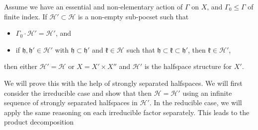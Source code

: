 \begin{prop}
  \label{prop:f-3.32}
  Assume we have an essential and non-elementary action of \(\Gamma\) on \(X\), and \(\Gamma_0 \leq \Gamma\) of finite index. If \(\mathcal{H}' \subset \mathcal{H}\) is a non-empty sub-pocset such that
  \begin{itemize}
  \item \(\Gamma_0 \cdot \mathcal{H}' = \mathcal{H}'\), and
  \item if \(\mathfrak{h}, \mathfrak{h}' \in \mathcal{H}'\) with \(\mathfrak{h} \subset \mathfrak{h}'\) and \(\mathfrak{k} \in \mathcal{H}\) such that \(\mathfrak{h} \subset \mathfrak{k} \subset \mathfrak{h}'\), then \(\mathfrak{k} \in \mathcal{H}'\),
  \end{itemize}
  then either \(\mathcal{H}' = \mathcal{H}\) or \(X = X' \times X''\) and \(\mathcal{H}'\) is the halfspace structure for \(X'\).
\end{prop}

We will prove this with the help of strongly separated halfspaces. We will first consider the irreducible case and show that then \(\mathcal{H} = \mathcal{H}'\) using an infinite sequence of strongly separated halfspaces in \(\mathcal{H}'\). In the reducible case, we will apply the same reasoning on each irreducible factor separately. This leads to the product decomposition





